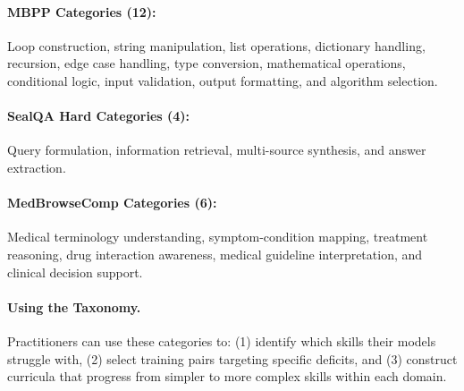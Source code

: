 \documentclass{article}
\theoremstyle{plain}
\theoremstyle{definition}
\theoremstyle{remark}
\begin{document}
\paragraph{MBPP Categories (12):}
Loop construction, string manipulation, list operations, dictionary handling, recursion, edge case handling, type conversion, mathematical operations, conditional logic, input validation, output formatting, and algorithm selection.

\paragraph{SealQA Hard Categories (4):}
Query formulation, information retrieval, multi-source synthesis, and answer extraction.

\paragraph{MedBrowseComp Categories (6):}
Medical terminology understanding, symptom-condition mapping, treatment reasoning, drug interaction awareness, medical guideline interpretation, and clinical decision support.

\paragraph{Using the Taxonomy.} Practitioners can use these categories to: (1) identify which skills their models struggle with, (2) select training pairs targeting specific deficits, and (3) construct curricula that progress from simpler to more complex skills within each domain.
\end{document}
